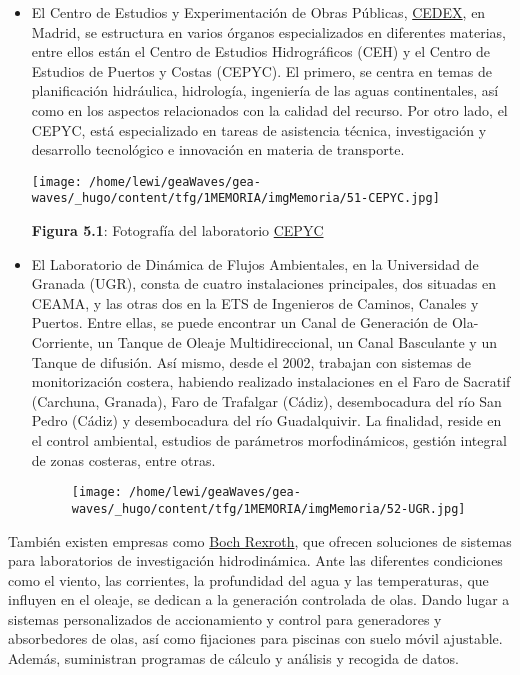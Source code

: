 \begin{itemize}
\item
  El Centro de Estudios y Experimentación de Obras Públicas,
  \href{http://www.cedex.es/CEDEX/LANG_CASTELLANO/ORGANISMO/CENTYLAB/}{CEDEX},
  en Madrid, se estructura en varios órganos especializados en
  diferentes materias, entre ellos están el Centro de Estudios
  Hidrográficos (CEH) y el Centro de Estudios de Puertos y Costas
  (CEPYC). El primero, se centra en temas de planificación hidráulica,
  hidrología, ingeniería de las aguas continentales, así como en los
  aspectos relacionados con la calidad del recurso. Por otro lado, el
  CEPYC, está especializado en tareas de asistencia técnica,
  investigación y desarrollo tecnológico e innovación en materia de
  transporte.

  \texttt{[image: /home/lewi/geaWaves/gea-waves/\_hugo/content/tfg/1MEMORIA/imgMemoria/51-CEPYC.jpg]}

  \textbf{Figura 5.1}: Fotografía del laboratorio
  \href{http://www.cedex.es/CEDEX/LANG_CASTELLANO/ORGANISMO/CENTYLAB/CEPYC/EQUIPAMIENTO/LEM0.htm}{CEPYC}
\end{itemize}

\begin{itemize}
\item
  El Laboratorio de Dinámica de Flujos Ambientales, en la Universidad de
  Granada (UGR), consta de cuatro instalaciones principales, dos
  situadas en CEAMA, y las otras dos en la ETS de Ingenieros de Caminos,
  Canales y Puertos. Entre ellas, se puede encontrar un Canal de
  Generación de Ola-Corriente, un Tanque de Oleaje Multidireccional, un
  Canal Basculante y un Tanque de difusión. Así mismo, desde el 2002,
  trabajan con sistemas de monitorización costera, habiendo realizado
  instalaciones en el Faro de Sacratif (Carchuna, Granada), Faro de
  Trafalgar (Cádiz), desembocadura del río San Pedro (Cádiz) y
  desembocadura del río Guadalquivir. La finalidad, reside en el control
  ambiental, estudios de parámetros morfodinámicos, gestión integral de
  zonas costeras, entre otras.

  \begin{figure}
  \centering
  \texttt{[image: /home/lewi/geaWaves/gea-waves/\_hugo/content/tfg/1MEMORIA/imgMemoria/52-UGR.jpg]}
  \caption{}
  \end{figure}
\end{itemize}

También existen empresas como
\href{https://www.boschrexroth.com/es/mx/industrias/aplicaciones-e-ingenieria-de-maquinaria/investigacion-hidrodinamica/hydrodynamic-research-1}{Boch
Rexroth}, que ofrecen soluciones de sistemas para laboratorios de
investigación hidrodinámica. Ante las diferentes condiciones como el
viento, las corrientes, la profundidad del agua y las temperaturas, que
influyen en el oleaje, se dedican a la generación controlada de olas.
Dando lugar a sistemas personalizados de accionamiento y control para
generadores y absorbedores de olas, así como fijaciones para piscinas
con suelo móvil ajustable. Además, suministran programas de cálculo y
análisis y recogida de datos.\\

